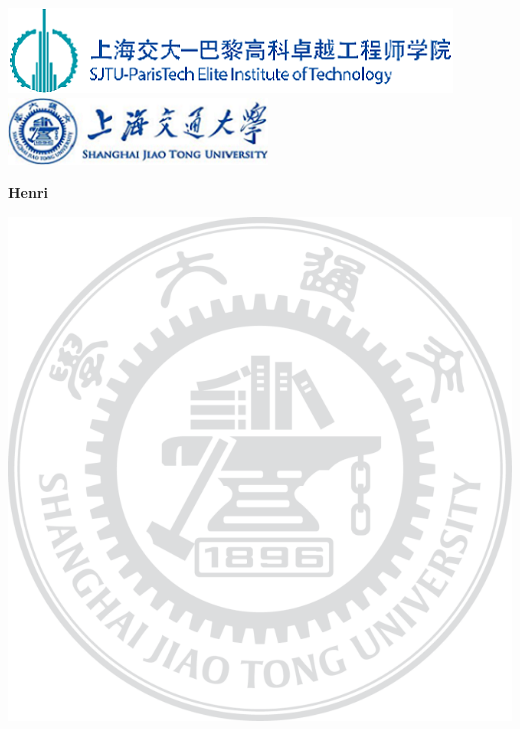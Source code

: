 \documentclass[a4paper,14pt,UTF8]{article}
\begin{document}
	
	\renewcommand{\labelitemi}{$\blacktriangleright$}
	\renewcommand{\labelitemii}{$\bullet$}
	
	\linespread{1.15}
	\selectfont
	\setlength{\parskip}{0.5em}
	
	
	\thispagestyle{empty}
	\begin{center}
		\includegraphics{cover5}
		\hspace{60pt}
		\includegraphics{cover2}
	\end{center}
	\vspace{125pt}
	\begin{center}

	\end{center}
	\vspace{2em} \Large
	\begin{center}
		\textbf{Henri }

	\end{center}
	\vspace{1em}
	\begin{center}
		\includegraphics[scale=1.2]{cover3}
	\end{center}
	\vspace{1em} \normalsize
\end{document}
